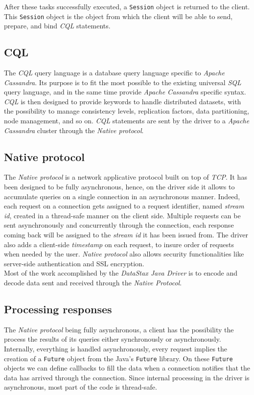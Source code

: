 \documentclass[a4paper]{report}
\newcommand{\djd}{\emph{DataStax Java Driver\xspace}}
\newcommand{\ca}{\emph{Apache Cassandra\xspace}}
\begin{document}
After these tasks successfully executed, a \verb;Session; object is returned to the client. This \verb;Session; object is the object from which the client will be able to send, prepare, and bind \emph{CQL} statements.

\subsection{CQL}
The \emph{CQL} query language is a database query language specific to \ca{}. Its purpose is to fit the most possible to the existing universal \emph{SQL} query language, and in the same time provide \ca{} specific syntax. \emph{CQL} is then designed to provide keywords to handle distributed datasets, with the possibility to manage consistency levels, replication factors, data partitioning, node management, and so on. \emph{CQL} statements are sent by the driver to a \ca{} cluster through the \emph{Native protocol}.

\subsection{Native protocol}
The \emph{Native protocol} is a network applicative protocol built on top of \emph{TCP}. It has been designed to be fully asynchronous, hence, on the driver side it allows to accumulate queries on a single connection in an asynchronous manner. Indeed, each request on a connection gets assigned to a request identifier, named \emph{stream id}, created in a thread-safe manner on the client side. Multiple requests can be sent asynchronously and concurrently through the connection, each response coming back will be assigned to the \emph{stream id} it has been issued from. The driver also adds a client-side \emph{timestamp} on each request, to insure order of requests when needed by the user.
\emph{Native protocol} also allows security functionalities like server-side authentication and SSL encryption.\\
Most of the work accomplished by the \djd{} is to encode and decode data sent and received through the \emph{Native Protocol}.

\subsection{Processing responses}
The \emph{Native protocol} being fully asynchronous, a client has the possibility the process the results of its queries either synchronously or asynchronously. Internally, everything is handled asynchronously, every request implies the creation of a \verb;Future; object from the Java's \verb;Future; library. On these \verb;Future; objects we can define callbacks to fill the data when a connection notifies that the data has arrived through the connection. Since internal processing in the driver is asynchronous, most part of the code is thread-safe.
\end{document}
